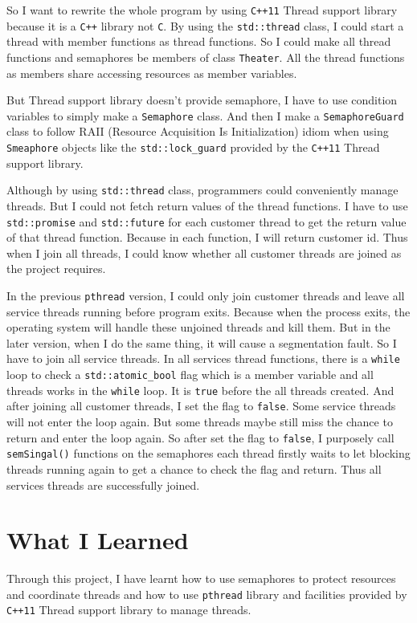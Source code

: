 \documentclass[a4paper]{report}
\begin{document}
So I want to rewrite the whole program by using \lstinline{C++11} Thread support library because it is a \lstinline{C++} library not \lstinline{C}. By using the \lstinline{std::thread} class, I could start a thread with member functions as thread functions. So I could make all thread functions and semaphores be members of class \lstinline{Theater}. All the thread functions as members share accessing resources as member variables.

But Thread support library doesn't provide semaphore, I have to use condition variables to simply make a \lstinline{Semaphore} class. And then I make a \lstinline{SemaphoreGuard} class to follow RAII (Resource Acquisition Is Initialization) idiom when using \lstinline{Smeaphore} objects like the \lstinline{std::lock_guard} provided by the \lstinline{C++11} Thread support library.

Although by using \lstinline{std::thread} class, programmers could conveniently manage threads. But I could not fetch return values of the thread functions. I have to use \lstinline{std::promise} and \lstinline{std::future} for each customer thread to get the return value of that thread function. Because in each function, I will return customer id. Thus when I join all threads, I could know whether all customer threads are joined as the project requires.

In the previous \lstinline{pthread} version, I could only join customer threads and leave all service threads running before program exits. Because when the process exits, the operating system will handle these unjoined threads and kill them. But in the later version, when I do the same thing, it will cause a segmentation fault. So I have to join all service threads. In all services thread functions, there is a \lstinline{while} loop to check a \lstinline{std::atomic_bool} flag which is a member variable and all threads works in the \lstinline{while} loop. It is \lstinline{true} before the all threads created. And after joining all customer threads, I set the flag to \lstinline{false}. Some service threads will not enter the loop again. But some threads maybe still miss the chance to return and enter the loop again. So after set the flag to \lstinline{false}, I purposely call \lstinline{semSingal()} functions on the semaphores each thread firstly waits to let blocking threads running again to get a chance to check the flag and return. Thus all services threads are successfully joined.

\section*{What I Learned}
Through this project, I have learnt how to use semaphores to protect resources and coordinate threads and how to use \lstinline{pthread} library and facilities provided by \lstinline{C++11} Thread support library to manage threads.
\end{document}
